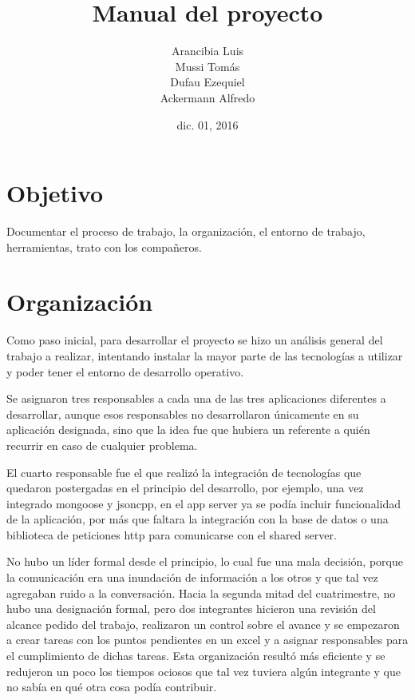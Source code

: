 \documentclass[letterpaper,10pt,spanish]{sphinxmanual}
\title{Manual del proyecto}
\date{dic. 01, 2016}
\author{Arancibia Luis \\ Mussi Tomás \\ Dufau Ezequiel \\ Ackermann Alfredo}
\begin{document}
\maketitle
\tableofcontents
{}\label{index::doc}



\chapter{Objetivo}
\label{manual:objetivo}\label{manual::doc}\label{manual:manual-del-proyecto}
Documentar el proceso de trabajo, la organización, el entorno de trabajo, herramientas, trato con los compañeros.


\chapter{Organización}
\label{manual:organizacion}
Como paso inicial, para desarrollar el proyecto se hizo un análisis general del trabajo a realizar, intentando instalar la mayor parte de las tecnologías a utilizar y poder tener el entorno de desarrollo operativo.

Se asignaron tres responsables a cada una de las tres aplicaciones diferentes a desarrollar, aunque esos responsables no desarrollaron únicamente en su aplicación designada, sino que la idea fue que hubiera un referente a quién recurrir en caso de cualquier problema.

El cuarto responsable fue el que realizó la integración de tecnologías que quedaron postergadas en el principio del desarrollo, por ejemplo, una vez integrado mongoose y jsoncpp, en el app server ya se podía incluir funcionalidad de la aplicación, por más que faltara la integración con la base de datos o una biblioteca de peticiones http para comunicarse con el shared server.

No hubo un líder formal desde el principio, lo cual fue una mala decisión, porque la comunicación era una inundación de información a los otros y que tal vez agregaban ruido a la conversación. Hacia la segunda mitad del cuatrimestre, no hubo una designación formal, pero dos integrantes hicieron una revisión del alcance pedido del trabajo, realizaron un control sobre el avance y se empezaron a crear tareas con los puntos pendientes en un excel y a asignar responsables para el cumplimiento de dichas tareas. Esta organización resultó más eficiente y se redujeron un poco los tiempos ociosos que tal vez tuviera algún integrante y que no sabía en qué otra cosa podía contribuir.
\end{document}
